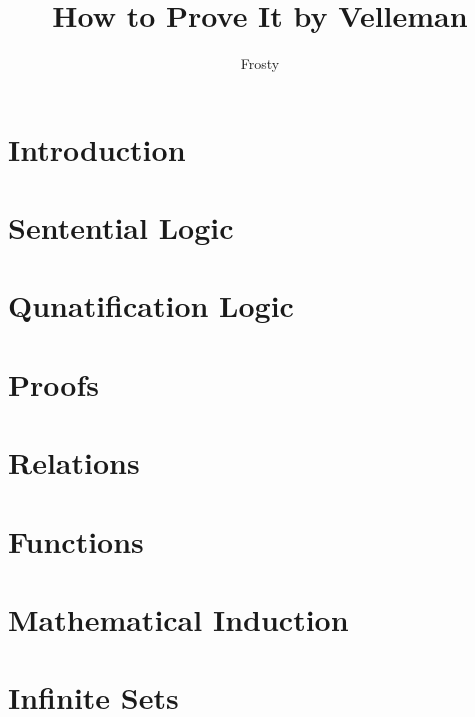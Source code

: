 \documentclass[10pt]{article}  %
\title{How to Prove It by Velleman}
\author{Frosty}
\begin{document}
\maketitle

\tableofcontents

\section*{Introduction}

\section{Sentential Logic}

\section{Qunatification Logic}

\section{Proofs}

\section{Relations}

\section{Functions}

\section{Mathematical Induction}

\section{Infinite Sets}

\end{document}
